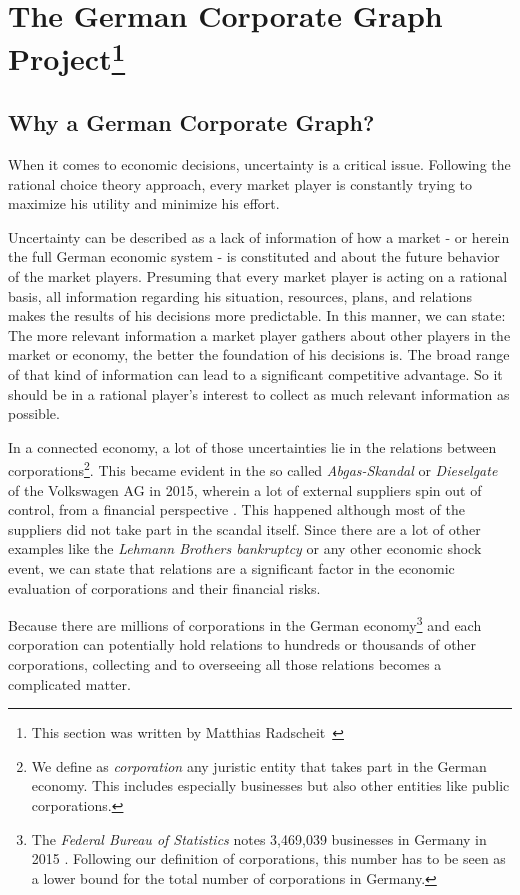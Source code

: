 \section[The German Corporate Graph Project]{The German Corporate Graph Project\protect\footnote{This section was written by Matthias Radscheit~\cite{loeperradscheit}}} %



\subsection{Why a German Corporate Graph?}
When it comes to economic decisions, uncertainty is a critical issue. Following the rational choice theory approach, every market player is constantly trying to maximize his utility and minimize his effort.

Uncertainty can be described as a lack of information of how a market - or herein the full German economic system - is constituted and about the future behavior of the market players. Presuming that every market player is acting on a rational basis, all information regarding his situation, resources, plans, and relations makes the results of his decisions more predictable. In this manner, we can state: The more relevant information a market player gathers about other players in the market or economy, the better the foundation of his decisions is. The broad range of that kind of information can lead to a significant competitive advantage. So it should be in a rational player's interest to collect as much relevant information as possible.

In a connected economy, a lot of those uncertainties lie in the relations between corporations\footnote{We define as \emph{corporation} any juristic entity that takes part in the German economy. This includes especially businesses but also other entities like public corporations.}. This became evident in the so called \emph{Abgas-Skandal} or \emph{Dieselgate} of the Volkswagen AG in 2015, wherein a lot of external suppliers spin out of control, from a financial perspective \cite{automobilwoche,stuttzeit}. This happened although most of the suppliers did not take part in the scandal itself. Since there are a lot of other examples like the \emph{Lehmann Brothers bankruptcy} or any other economic shock event, we can state that relations are a significant factor in the economic evaluation of corporations and their financial risks.

Because there are millions of corporations in the German economy\footnote{The \emph{Federal Bureau of Statistics} notes 3,469,039 businesses in Germany in 2015 \cite{destatis1}. Following our definition of corporations, this number has to be seen as a lower bound for the total number of corporations in Germany.} and each corporation can potentially hold relations to hundreds or thousands of other corporations, collecting and to overseeing all those relations becomes a complicated matter.

